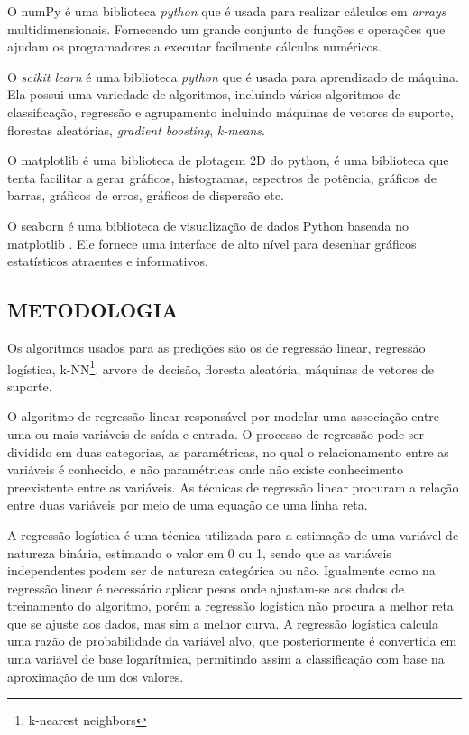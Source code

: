 O numPy é uma biblioteca \textit{python} que é usada para realizar cálculos em \textit{arrays} multidimensionais. Fornecendo um grande conjunto de funções e operações que ajudam os programadores a executar facilmente cálculos numéricos.\cite{numpy}

O \textit{scikit learn} é uma biblioteca \textit{python} que é usada para aprendizado de máquina. Ela possui uma variedade de algoritmos, incluindo vários algoritmos de classificação, regressão e agrupamento incluindo máquinas de vetores de suporte, florestas aleatórias, \textit{gradient boosting}, \textit{k-means}\cite{scikit}.

O matplotlib é uma biblioteca de plotagem 2D do python, é uma biblioteca que tenta facilitar a gerar gráficos, histogramas, espectros de potência, gráficos de barras, gráficos de erros, gráficos de dispersão etc\cite{matplotlib}.

O seaborn é uma biblioteca de visualização de dados Python baseada no matplotlib . Ele fornece uma interface de alto nível para desenhar gráficos estatísticos atraentes e informativos.\cite{seaborn}


\subsection{METODOLOGIA}
Os algoritmos usados para as predições são os de regressão linear, regressão logística, k-NN\footnote{k-nearest neighbors},  arvore de decisão, floresta aleatória, máquinas de vetores de suporte.

O algoritmo de regressão linear responsável por modelar uma associação entre uma ou mais variáveis de saída e entrada. O processo de regressão pode ser dividido em duas categorias, as paramétricas, no qual o relacionamento entre as variáveis é conhecido, e não paramétricas onde não existe conhecimento preexistente entre as variáveis. As técnicas de regressão linear procuram a relação entre duas variáveis por meio de uma equação de uma linha reta\cite{Bogoni2019}.

A regressão logística é uma técnica utilizada para a estimação de uma variável de natureza binária, estimando o valor em 0 ou 1, sendo que as variáveis independentes podem ser de natureza categórica ou não. Igualmente como na regressão linear é
necessário aplicar pesos onde ajustam-se aos dados de treinamento do algoritmo, porém a regressão logística não procura a melhor reta que se ajuste aos dados, mas sim a melhor curva. A regressão logística calcula uma razão de probabilidade da variável alvo, que posteriormente é convertida em uma variável de base logarítmica, permitindo assim a classificação com base na aproximação de um dos valores\cite{Witten2011}.

